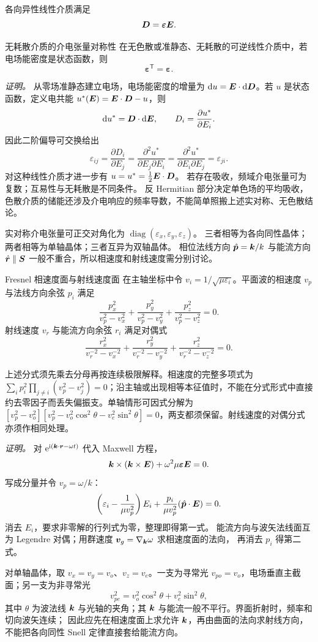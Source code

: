 各向异性线性介质满足
\[
 \bm{D}=\boldsymbol\varepsilon\bm{E}.
\]

\begin{advtheorem}{无耗散介质的介电张量对称性}\label{advA5:thm:epsilon-symmetric}
在无色散或准静态、无耗散的可逆线性介质中，若电场能密度是状态函数，则
\[
 \boxed{\boldsymbol\varepsilon^{\mathsf T}
 =\boldsymbol\varepsilon}.
\]
\end{advtheorem}

\noindent\textit{证明。}
从零场准静态建立电场，电场能密度的增量为
$\mathop{}\!\mathrm d u=\bm{E}\cdot\mathop{}\!\mathrm d\bm{D}$。若 $u$ 是状态函数，定义电共能
$u^*(\bm{E})=\bm{E}\cdot\bm{D}-u$，则
\[
 \mathop{}\!\mathrm d u^*=\bm{D}\cdot\mathop{}\!\mathrm d\bm{E},\qquad
 D_i=\frac{\partial u^*}{\partial E_i}.
\]
因此二阶偏导可交换给出
\[
 \varepsilon_{ij}=\frac{\partial D_i}{\partial E_j}
 =\frac{\partial^2u^*}{\partial E_j\partial E_i}
 =\frac{\partial^2u^*}{\partial E_i\partial E_j}
 =\varepsilon_{ji}.
\]
对这种线性介质才进一步有 $u=u^*=\tfrac12\bm{E}\cdot\bm{D}$。
若存在吸收，频域介电张量可为复数；互易性与无耗散是不同条件。
反 Hermitian 部分决定单色场的平均吸收，色散介质的储能还涉及介电响应的频率导数，不能简单照搬上述实对称、无色散结论。

实对称介电张量可正交对角化为
$\operatorname{diag}(\varepsilon_x,\varepsilon_y,\varepsilon_z)$。
三者相等为各向同性晶体；两者相等为单轴晶体；三者互异为双轴晶体。
相位法线方向 $\hat{\bm{p}}=\bm{k}/k$ 与能流方向
$\hat{\bm{r}}\parallel\bm{S}$ 一般不重合，所以相速度和射线速度需分别讨论。

\begin{advtheorem}{Fresnel 相速度面与射线速度面}\label{advA5:thm:fresnel-crystal}
在主轴坐标中令
$v_i=1/\sqrt{\mu\varepsilon_i}$。平面波的相速度 $v_p$ 与法线方向余弦
$p_i$ 满足
\[
 \boxed{
 \frac{p_x^2}{v_p^2-v_x^2}
 +\frac{p_y^2}{v_p^2-v_y^2}
 +\frac{p_z^2}{v_p^2-v_z^2}=0}.
\]
射线速度 $v_r$ 与能流方向余弦 $r_i$ 满足对偶式
\[
 \boxed{
 \frac{r_x^2}{v_r^{-2}-v_x^{-2}}
 +\frac{r_y^2}{v_r^{-2}-v_y^{-2}}
 +\frac{r_z^2}{v_r^{-2}-v_z^{-2}}=0}.
\]
\end{advtheorem}

上述分式须先乘去分母再按连续极限解释。相速度的完整多项式为 $\sum_i p_i^2\prod_{j\ne i}(v_p^2-v_j^2)=0$；沿主轴或出现相等本征值时，不能在分式形式中直接约去零因子而丢失偏振支。单轴情形可因式分解为 $[v_p^2-v_o^2][v_p^2-v_o^2\cos^2\theta-v_e^2\sin^2\theta]=0$，两支都须保留。射线速度的对偶分式亦须作相同处理。

\noindent\textit{证明。}
对 $\mathrm e^{\mathrm i(\bm{k}\cdot\bm{r}-\omega t)}$ 代入 Maxwell 方程，
\[
 \bm{k}\times(\bm{k}\times\bm{E})
 +\omega^2\mu\boldsymbol\varepsilon\bm{E}=0.
\]
写成分量并令 $v_p=\omega/k$：
\[
 \left(\varepsilon_i-\frac1{\mu v_p^2}\right)E_i
 +\frac{p_i}{\mu v_p^2}(\hat{\bm{p}}\cdot\bm{E})=0.
\]
消去 $E_i$，要求非零解的行列式为零，整理即得第一式。
能流方向与波矢法线面互为 Legendre 对偶；用群速度
$\bm{v}_g=\nabla_{\bm{k}}\omega$ 求相速度面的法向，
再消去 $p_i$ 得第二式。

对单轴晶体，取 $v_x=v_y=v_o$、$v_z=v_e$。一支为寻常光
$v_{po}=v_o$，电场垂直主截面；另一支为非寻常光
\[
 \boxed{v_{pe}^2=v_o^2\cos^2\theta+v_e^2\sin^2\theta},
\]
其中 $\theta$ 为波法线 $\bm{k}$ 与光轴的夹角；其 $\bm{k}$ 与能流一般不平行。界面折射时，频率和切向波矢连续；
因此应先在相速度面上求允许 $\bm{k}$，再由曲面的法向求射线方向，
不能把各向同性 Snell 定律直接套给能流方向。
